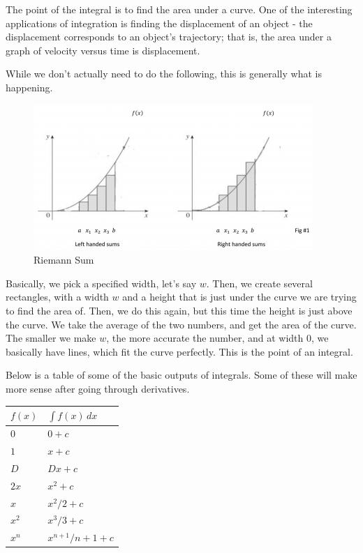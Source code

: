 The point of the integral is to find the area under a curve. 
One of the interesting applications of integration is finding the displacement of an object - the displacement corresponds to an object's trajectory; that is, the area under a graph of velocity versus time is displacement.

While we don't actually need to do the following, this is generally what is happening. 

\begin{centering}
\begin{figure}[H]
\caption{Riemann Sum}
\includegraphics[scale=0.8]{../rieman.jpg}
\end{figure}
\end{centering}

Basically, we pick a specified width, let's say $w$. 
Then, we create several rectangles, with a width $w$ and a height that is just under the curve we are trying to find the area of. 
Then, we do this again, but this time the height is just above the curve. 
We take the average of the two numbers, and get the area of the curve. 
The smaller we make $w$, the more accurate the number, and at width $0$, we basically have lines, which fit the curve perfectly. 
This is the point of an integral.

Below is a table of some of the basic outputs of integrals. Some of these will make more sense after going through derivatives.

\begin{tabular}{l|l}
    $f(x)$ & $\int f(x) \, dx$\\
    \hline
     $0$ & $0+c$ \\
     $1$ & $x+c$ \\
     $D$ & $Dx+c$ \\
     $2x$ & $x^2 + c$ \\
     $x$ & $x^2/2 + c$ \\
     $x^2$ & $x^3/3 + c$ \\
     $x^n$ & $x^{n+1}/n+1 + c$
\end{tabular}

